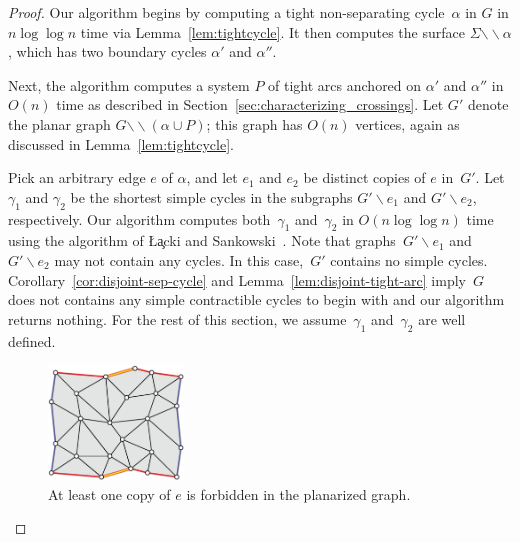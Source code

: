 \documentclass[11pt,twoside]{article}
\def\snip{\mathbin{\raisebox{0.15ex}{\rotatebox[origin=c]{60}{\Rightscissors}\!}}}
\def\snip{\mathbin{\backslash\!\!\backslash}}
\def\subsnip{\mathbin{\raisebox{0.15ex}{\rotatebox[origin=c]{60}{\footnotesize\Rightscissors}\!}}}
\def\Gsnip{\mathord{G_{\subsnip}}}
\def\Gsnip{G'}
\begin{document}
{%


\begin{proof}

Our algorithm begins by computing a tight non-separating cycle~$\alpha$ in $G$ in $n \log \log n$ time via Lemma~\ref{lem:tightcycle}.
It then computes the surface $\Sigma \snip \alpha$, which has two boundary cycles $\alpha'$ and $\alpha''$.

Next, the algorithm computes a system $P$ of tight arcs anchored on $\alpha'$ and $\alpha''$ in $O(n)$ time as described in Section~\ref{sec:characterizing_crossings}.
Let $\Gsnip$ denote the planar graph $G \snip (\alpha \cup P)$; this graph has $O(n)$ vertices, again as discussed in Lemma~\ref{lem:tightcycle}.

Pick an arbitrary edge $e$ of $\alpha$, and let $e_1$ and $e_2$ be distinct copies of $e$ in~$\Gsnip$.  Let $\gamma_1$ and $\gamma_2$ be the shortest simple cycles in the  subgraphs $\Gsnip \backslash e_1$ and $\Gsnip \backslash e_2$, respectively.  Our algorithm computes both~$\gamma_1$ and~$\gamma_2$ in $O(n \log\log n)$ time using the algorithm of \L\c{a}cki and Sankowski~\cite{ls-mcsc-11}. Note that graphs~$\Gsnip \backslash e_1$ and~$\Gsnip \backslash e_2$ may not contain any cycles. In this case,~$\Gsnip$ contains no simple cycles.  Corollary~\ref{cor:disjoint-sep-cycle} and Lemma~\ref{lem:disjoint-tight-arc} imply~$G$ does not contains any simple contractible cycles to begin with and our algorithm returns nothing. 
For the rest of this section, we assume~$\gamma_1$ and~$\gamma_2$ are well defined.

\begin{figure}[ht]
\centering
\includegraphics[height=1.2in]{Fig/forbidden-pair}
\caption{At least one copy of $e$ is forbidden in the planarized graph.}
\label{fig:global_forbidden-pair}
\end{figure}


\end{proof}}
\end{document}
